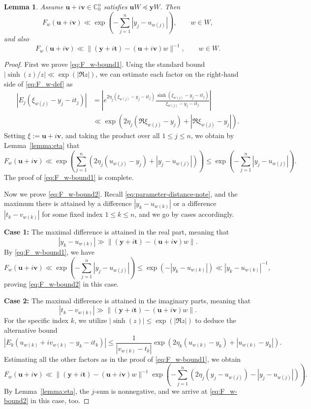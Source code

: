 \documentclass[11pt,oneside]{amsart}
\numberwithin{equation}{section}
\theoremstyle{remark}
\theoremstyle{plain}
\newtheorem{lemma}{Lemma}
\newcommand\CC{\mathbb{C}}
\newcommand{\bt}{\mathbf{t}}
\newcommand{\bu}{\mathbf{u}}
\newcommand{\bv}{\mathbf{v}}
\newcommand{\by}{\mathbf{y}}
\renewcommand\leq{\leqslant}
\begin{document}
\begin{lemma}\label{lemma:F_w-bounds} Assume $\bu+i\bv\in\CC^n_0$ satisfies $\bu W\preceq\by W$. Then
\begin{equation}\label{eq:F_w-bound1}
F_w(\bu+i\bv)\ll \exp\left(-\sum_{j=1}^n |y_j-u_{w(j)}|\right),\qquad w\in W,
\end{equation}
and also
\begin{equation}\label{eq:F_w-bound2}
F_w(\bu+i\bv)\ll \|(\by+i\bt)-(\bu+i\bv)w\|^{-1}, \qquad w\in W.
\end{equation}
\end{lemma}

\begin{proof} First we prove \eqref{eq:F_w-bound1}. Using the standard bound $\left| \sinh(z)/z \right| \ll \exp(|\Re z|)$, we can estimate each factor on the right-hand side of \eqref{eq:F_w-def} as
\[
\begin{split}
|E_{j}(\xi_{w(j)}-y_j-it_j)| & = \left| e^{2\eta_j(\xi_{w(j)}-y_j-it_j)} \frac{\sinh(\xi_{w(j)}-y_j-it_j)}{\xi_{w(j)}-y_j-it_j} \right| \\ & \ll \exp\left( 2\eta_j (\Re\xi_{w(j)} - y_j) + |\Re\xi_{w(j)} - y_j| \right).
\end{split}
\]
Setting $\xi:=\bu+i\bv$, and taking the product over all $1 \leq j \leq n$, we obtain by Lemma~\ref{lemma:eta} that
\[
F_{w}(\bu+i\bv) \ll \exp \left( \sum_{j=1}^n \left( 2\eta_j(u_{w(j)}-y_j) + |y_j - u_{w(j)}| \right) \right) \leq \exp\left(-\sum_{j=1}^n |y_j - u_{w(j)}|\right).
\]
The proof of \eqref{eq:F_w-bound1} is complete.

Now we prove \eqref{eq:F_w-bound2}. Recall \eqref{eq:parameter-distance-note}, and the maximum there is attained by a difference $|y_{k}-u_{w(k)}|$ or a difference $|t_{k}-v_{w(k)}|$ for some fixed index $1\leq k\leq n$, and we go by cases accordingly.

\textbf{Case 1:} The maximal difference is attained in the real part, meaning that
\[
|y_{k} - u_{w(k)}| \gg \|(\by+i\bt)-(\bu+i\bv)w\|.
\]
By \eqref{eq:F_w-bound1}, we have
\[
F_w(\bu+i\bv) \ll \exp\left( - \sum_{j=1}^n |y_j - u_{w(j)}| \right) \leq \exp(-|y_{k} - u_{w(k)}|) \ll |y_{k}-u_{w(k)}|^{-1},
\]
proving \eqref{eq:F_w-bound2} in this case.

\textbf{Case 2:} The maximal difference is attained in the imaginary parts, meaning that
\[
|t_{k} - v_{w(k)}| \gg \|(\by+i\bt)-(\bu+i\bv)w\|.
\]
For the specific index $k$, we utilize $|\sinh(z)|\leq \exp(|\Re z|)$ to deduce the alternative bound
\[
\left|E_k(u_{w(k)}+iv_{w(k)}-y_{k}-it_{k})\right| \leq \frac{1}{|v_{w(k)}-t_{k}|} \exp\left( 2\eta_{k}(u_{w(k)} - y_{k}) + |u_{w(k)} - y_{k}| \right).
\]
Estimating all the other factors as in the proof of \eqref{eq:F_w-bound1}, we obtain
\[ F_w(\bu+i\bv) \ll \|(\by+i\bt)-(\bu+i\bv)w\|^{-1} \exp\left( - \sum_{j=1}^n \left( 2\eta_j(y_j - u_{w(j)}) - |y_j - u_{w(j)}| \right) \right). \]
By Lemma~\ref{lemma:eta}, the $j$-sum is nonnegative, and we arrive at \eqref{eq:F_w-bound2} in this case, too.
\end{proof}
\end{document}
